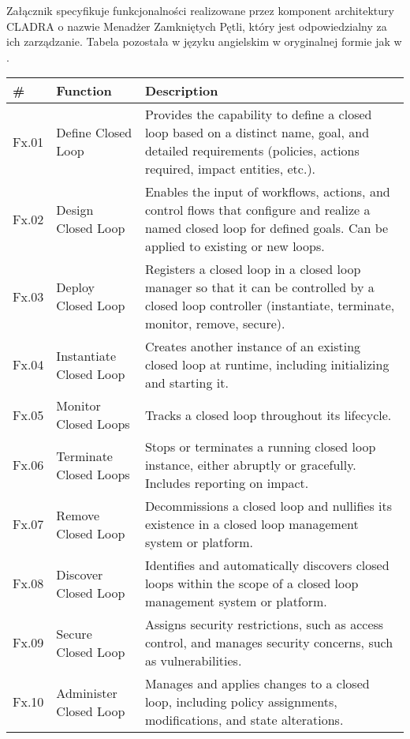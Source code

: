 \hypertarget{appendix:11}{}

Załącznik specyfikuje funkcjonalności realizowane przez komponent architektury CLADRA o nazwie Menadżer Zamkniętych Pętli, który jest odpowiedzialny za ich zarządzanie. Tabela pozostała w języku angielskim w oryginalnej formie jak w \cite{tmforum2022ai}.

\begin{table}[h!]
\centering
\renewcommand{\arraystretch}{1.2} %
\begin{tabular}{|p{2cm}|p{4cm}|p{9cm}|}
\hline
\textbf{\#} & \textbf{Function} & \textbf{Description} \\ \hline
Fx.01 & Define Closed Loop & Provides the capability to define a closed loop based on a distinct name, goal, and detailed requirements (policies, actions required, impact entities, etc.). \\ \hline
Fx.02 & Design Closed Loop & Enables the input of workflows, actions, and control flows that configure and realize a named closed loop for defined goals. Can be applied to existing or new loops. \\ \hline
Fx.03 & Deploy Closed Loop & Registers a closed loop in a closed loop manager so that it can be controlled by a closed loop controller (instantiate, terminate, monitor, remove, secure). \\ \hline
Fx.04 & Instantiate Closed Loop & Creates another instance of an existing closed loop at runtime, including initializing and starting it. \\ \hline
Fx.05 & Monitor Closed Loops & Tracks a closed loop throughout its lifecycle. \\ \hline
Fx.06 & Terminate Closed Loops & Stops or terminates a running closed loop instance, either abruptly or gracefully. Includes reporting on impact. \\ \hline
Fx.07 & Remove Closed Loop & Decommissions a closed loop and nullifies its existence in a closed loop management system or platform. \\ \hline
Fx.08 & Discover Closed Loop & Identifies and automatically discovers closed loops within the scope of a closed loop management system or platform. \\ \hline
Fx.09 & Secure Closed Loop & Assigns security restrictions, such as access control, and manages security concerns, such as vulnerabilities. \\ \hline
Fx.10 & Administer Closed Loop & Manages and applies changes to a closed loop, including policy assignments, modifications, and state alterations. \\ \hline

\end{tabular}
\end{table}
